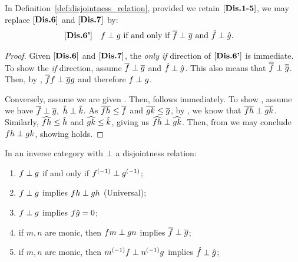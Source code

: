 \begin{lemma}\label{lem:disjointness_equivalent_axioms}
  In Definition~\ref{def:disjointness_relation}, provided we retain $[\text{\bfseries {Dis}.{1-5}}]$, we may
  replace $[\text{\bfseries {Dis}.{6}}]$ and $[\text{\bfseries {Dis}.{7}}]$ by:
  \begin{align*}
    [\text{\bfseries {Dis}.{6'}}]\quad &f\perp g\text{ if and only if }\overline{f} \perp \overline{g}
      \text{ and }\hat{f}\perp\hat{g}.
  \end{align*}
\end{lemma}
\begin{proof}
  Given $[\text{\bfseries {Dis}.{6}}]$ and $[\text{\bfseries {Dis}.{7}}]$, the \emph{only if} direction of $[\text{\bfseries {Dis}.{6'}}]$ is
  immediate. To show the \emph{if} direction, assume $\overline{f} \perp \overline{g}$ and
  $\hat{f}\perp\hat{g}$. This also means that $\overline{\overline{f}} \perp \overline{\overline{g}}$. Then, by
  , $\overline{f} f \perp \overline{g}g$ and therefore $f \perp g$.

  Conversely, assume we are given . Then,  follows immediately. To show
  , assume we have $\rst{f}\cdperp \rst{g},\ \rg{h}\cdperp \rg{k}$. As
  $\overline{f h} \le \overline{f}$ and $\overline{g k}\le\overline{g}$, by , we know that
  $\overline{f h} \perp \overline{g k}$. Similarly, $\widehat{f h} \le \hat{h}$ and $\widehat{g k} \le \hat{k}$,
  giving us $\widehat{f h}\perp \widehat{g k}$. Then, from  we may conclude
  $f h \perp g k$, showing  holds.
\end{proof}
\begin{lemma}\label{lem:disjointness_various}
  In an inverse category \X with $\perp$ a disjointness relation:
  \begin{enumerate}[{(}i{)}]
    \item $f \perp g$ if and only if ${f}^{(-1)}\perp {g}^{(-1)}$; \label{lemitem:djv_inverses}
    \item $f \perp g$ implies $f h \perp g h$ (Universal);\label{lemitem:djv_universal}
    \item $f \perp g$ implies $f\hat{g} = 0$;
    \item if $m,n$ are monic, then $f m \perp g n$ implies $\overline{f} \perp \overline{g}$;
    \item if $m,n$ are monic, then ${m}^{(-1)} f \perp {n}^{(-1)}g$ implies $\hat{f} \perp \hat{g}$;
  \end{enumerate}
\end{lemma}
